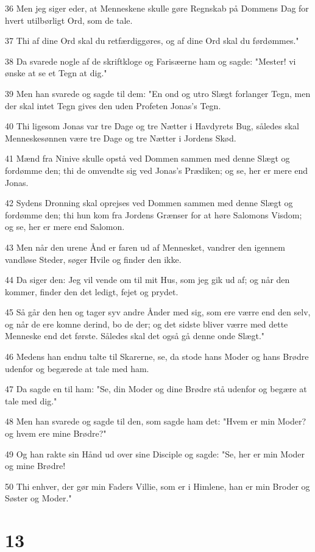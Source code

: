 \par 36 Men jeg siger eder, at Menneskene skulle gøre Regnskab på Dommens Dag for hvert utilbørligt Ord, som de tale.
\par 37 Thi af dine Ord skal du retfærdiggøres, og af dine Ord skal du førdømmes."
\par 38 Da svarede nogle af de skriftkloge og Farisæerne ham og sagde: "Mester! vi ønske at se et Tegn at dig."
\par 39 Men han svarede og sagde til dem: "En ond og utro Slægt forlanger Tegn, men der skal intet Tegn gives den uden Profeten Jonas's Tegn.
\par 40 Thi ligesom Jonas var tre Dage og tre Nætter i Havdyrets Bug, således skal Menneskesønnen være tre Dage og tre Nætter i Jordens Skød.
\par 41 Mænd fra Ninive skulle opstå ved Dommen sammen med denne Slægt og fordømme den; thi de omvendte sig ved Jonas's Prædiken; og se, her er mere end Jonas.
\par 42 Sydens Dronning skal oprejses ved Dommen sammen med denne Slægt og fordømme den; thi hun kom fra Jordens Grænser for at høre Salomons Visdom; og se, her er mere end Salomon.
\par 43 Men når den urene Ånd er faren ud af Mennesket, vandrer den igennem vandløse Steder, søger Hvile og finder den ikke.
\par 44 Da siger den: Jeg vil vende om til mit Hus, som jeg gik ud af; og når den kommer, finder den det ledigt, fejet og prydet.
\par 45 Så går den hen og tager syv andre Ånder med sig, som ere værre end den selv, og når de ere komne derind, bo de der; og det sidste bliver værre med dette Menneske end det første. Således skal det også gå denne onde Slægt."
\par 46 Medens han endnu talte til Skarerne, se, da stode hans Moder og hans Brødre udenfor og begærede at tale med ham.
\par 47 Da sagde en til ham: "Se, din Moder og dine Brødre stå udenfor og begære at tale med dig."
\par 48 Men han svarede og sagde til den, som sagde ham det: "Hvem er min Moder? og hvem ere mine Brødre?"
\par 49 Og han rakte sin Hånd ud over sine Disciple og sagde: "Se, her er min Moder og mine Brødre!
\par 50 Thi enhver, der gør min Faders Villie, som er i Himlene, han er min Broder og Søster og Moder."

\chapter{13}


